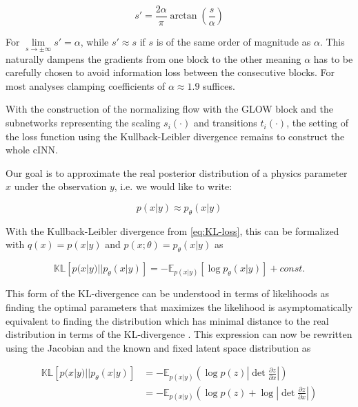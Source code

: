 \begin{equation*}
	s' = \frac{2\alpha}{\pi} \arctan\left(\frac{s}{\alpha}\right)
\end{equation*}

For $\lim\limits_{s\rightarrow\pm\infty} s' = \alpha$, while $s' \approx s$ if $s$ is of the same order of magnitude as $\alpha$. This naturally dampens the gradients from one block to the other meaning $\alpha$ has to be carefully chosen to avoid information loss between the consecutive blocks. For most analyses clamping coefficients of $\alpha \approx 1.9$ suffices.

With the construction of the normalizing flow with the GLOW block and the subnetworks representing the scaling $s_i(\cdot)$ and transitions $t_i(\cdot)$, the setting of the loss function using the Kullback-Leibler divergence remains to construct the whole cINN.


Our goal is to approximate the real posterior distribution of a physics parameter $x$ under the observation $y$, i.e. we would like to write:

\begin{equation*}
	p(x | y) \approx p_\theta(x | y)
\end{equation*}

With the Kullback-Leibler divergence from \ref{eq:KL-loss}, this can be formalized with $q(x) = p(x | y)$ and $p(x; \theta) = p_\theta(x | y)$ as

\begin{equation*}
	\mathbb{KL}\left[p(x | y) || p_\theta(x | y) \right] = - \mathbb{E}_{p(x | y)} \left[ \log p_\theta(x | y)\right] + const.
\end{equation*}

This form of the KL-divergence can be understood in terms of likelihoods as finding the optimal parameters that maximizes the likelihood is asymptomatically equivalent to finding the distribution which has minimal distance to the real distribution in terms of the KL-divergence \cite{Bishop_book}. This expression can now be rewritten using the Jacobian and the known and fixed latent space distribution as

\begin{equation*}
	\begin{aligned}
		\mathbb{KL}\left[p(x | y) || p_\theta(x | y) \right] &= - \mathbb{E}_{p(x | y)}\left(\log p(z) \left|\det\frac{\partial z}{\partial x}\right|\right) \\
		&= - \mathbb{E}_{p(x | y)}\left(\log p(z)  + \log \left|\det\frac{\partial z}{\partial x}\right|\right)
	\end{aligned}
\end{equation*}

